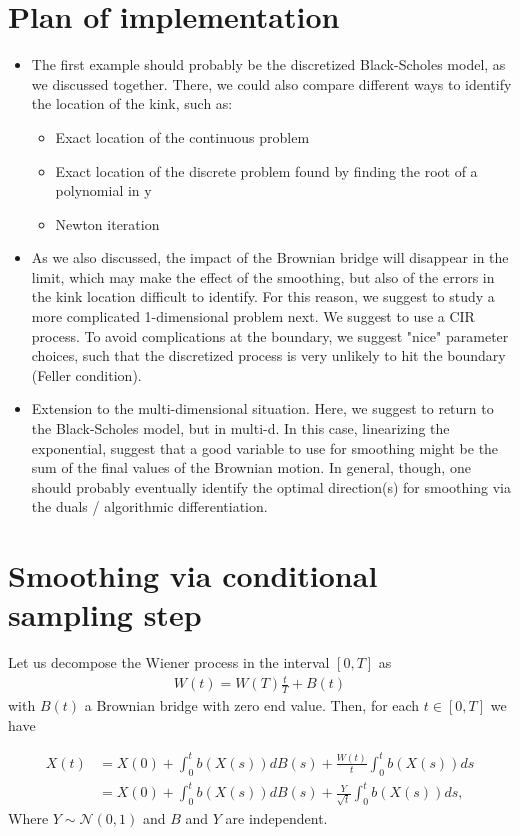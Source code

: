 \documentclass[11pt]{article}
\begin{document}
\section{Plan of implementation}

\begin{itemize}
	\item The first example should probably be the discretized Black-Scholes
	model, as we discussed together. There, we could also compare
	different ways to identify the location of the kink, such as:
	\begin{itemize}
		\item Exact location of the continuous problem
		\item  Exact location of the discrete problem found by finding the root of a polynomial in y
		\item Newton iteration
	\end{itemize}
	\item  As we also discussed, the impact of the Brownian bridge will disappear in the limit, which may make the effect of the smoothing, 	but also of the errors in the kink location difficult to identify. For 	this reason, we suggest to study a more complicated 1-dimensional 	problem next. We suggest to use a CIR process. To avoid complications at the boundary, we suggest "nice" parameter choices, such that the discretized process is very unlikely to hit the boundary (Feller
	condition).
	\item Extension to the multi-dimensional situation. Here, we suggest to
	return to the Black-Scholes model, but in multi-d. In this case,
	linearizing the exponential, suggest that a good variable to use for smoothing might be the sum of the final values of the Brownian motion.
	In general, though, one should probably eventually identify the
	optimal direction(s) for smoothing via the duals / algorithmic
	differentiation.
\end{itemize}

\section{Smoothing via conditional sampling step}
Let us decompose the Wiener process in the interval $[0, T]$ as
\begin{align}
	W(t)=W(T) \frac{t}{T}+B(t)
\end{align}
with $B(t)$  a Brownian bridge with zero end value. Then,
for each $t \in [0, T]$ we have

\begin{align}
	X(t) &=X(0)+\int_{0}^{t} b(X(s)) dB(s)+\frac{W(t)}{t} \int_{0}^{t} b(X(s)) ds\nonumber\\
	&=X(0)+\int_{0}^{t} b(X(s)) dB(s)+\frac{Y}{\sqrt{t}} \int_{0}^{t} b(X(s))ds,
\end{align}
Where $Y \sim \mathcal{N}(0,1)$ and $B$ and $Y$ are independent.
\end{document}
